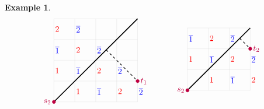 \documentclass[11pt, leqno]{amsart}
\theoremstyle{plain}
\theoremstyle{definition}
\newtheorem{example}[theorem]{Example}
\numberwithin{equation}{section}
\newcommand{\othree}{\overline{3}}
\newcommand{\otwo}{\overline{2}}
\newcommand{\one}{\overline{1}}
\begin{document}
\begin{example}
\[\begin{array}{c@{\hspace{30pt}}c}
\begin{tikzpicture}[baseline=2cm,scale=0.9]
\draw[gray!40,very thin] (0,0) grid (4,4);
\foreach \i in {0,...,2} \draw (2-\i,\i+0.5) node[right=-2pt,blue] {$\one$};
\foreach \i in {0,...,3} \draw (4-\i,\i+0.5) node[right=-2pt,blue] {$\otwo$};
\foreach \i in {0,1} \draw (1-\i,\i+0.5) node[right=-2pt,red] {$1$};
\foreach \i in {0,...,3} \draw (3-\i,\i+0.5) node[right=-2pt,red] {$2$};
\draw[-, very thick] (0,0) -- (4,4);
\draw[thick,dashed] (2.5,2.5) -- +(1.5, -1.5);
\draw[fill=red, color=purple] (0, 0) circle (0.08) node[anchor=east] {$s_2$};
\draw[fill=red, color=purple] (4, 1) circle (0.08) node[anchor=west] {$t_1$};
\end{tikzpicture}
&
\begin{tikzpicture}[baseline=1.5cm,scale=0.9]
\draw[gray!40,very thin] (0,0) grid (3,3);
\foreach \i in {0,...,2} \draw (2-\i,\i+0.5) node[right=-2pt,blue] {$\one$};
\foreach \i in {0,...,1} \draw (3-\i,\i+1.5) node[right=-2pt,blue] {$\otwo$};
\foreach \i in {0,1} \draw (1-\i,\i+0.5) node[right=-2pt,red] {$1$};
\foreach \i in {0,...,2} \draw (3-\i,\i+0.5) node[right=-2pt,red] {$2$};
\draw[-, very thick] (0,0) -- (3,3);
\draw[thick,dashed] (2.5,2.5) -- +(0.5, -0.5);
\draw[fill=red, color=purple] (0, 0) circle (0.08) node[anchor=east] {$s_2$};
\draw[fill=red, color=purple] (3, 2) circle (0.08) node[anchor=west] {$t_2$};
\end{tikzpicture}
\end{array}
\]
\end{example}
\end{document}
